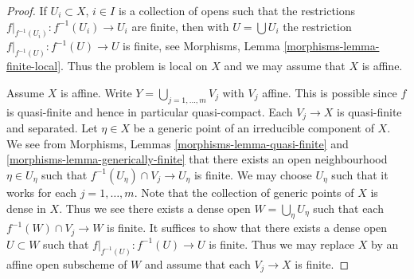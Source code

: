 \begin{proof}
If $U_i \subset X$, $i \in I$ is a collection of opens such that the
restrictions $f|_{f^{-1}(U_i)} : f^{-1}(U_i) \to U_i$ are finite,
then with $U = \bigcup U_i$ the restriction $f|_{f^{-1}(U)} : f^{-1}(U) \to U$
is finite, see
Morphisms, Lemma \ref{morphisms-lemma-finite-local}.
Thus the problem is local on $X$ and we may assume that $X$ is affine.

\medskip\noindent
Assume $X$ is affine.
Write $Y = \bigcup_{j = 1, \ldots, m} V_j$ with $V_j$ affine.
This is possible since $f$ is quasi-finite and hence
in particular quasi-compact. Each $V_j \to X$ is quasi-finite
and separated. Let $\eta \in X$ be a generic point of an irreducible
component of $X$. We see from
Morphisms, Lemmas
\ref{morphisms-lemma-quasi-finite} and \ref{morphisms-lemma-generically-finite}
that there exists an open neighbourhood $\eta \in U_\eta$ such that
$f^{-1}(U_\eta) \cap V_j \to U_\eta$ is finite. We may choose $U_\eta$ such
that it works for each $j = 1, \ldots, m$.
Note that the collection of generic points of $X$ is dense in $X$.
Thus we see there exists a dense open $W = \bigcup_\eta U_\eta$
such that each $f^{-1}(W) \cap V_j \to W$ is finite.
It suffices to show that there exists a dense open $U \subset W$
such that $f|_{f^{-1}(U)} : f^{-1}(U) \to U$ is finite.
Thus we may replace $X$ by an affine open subscheme of $W$ and
assume that each $V_j \to X$ is finite.


\end{proof}
